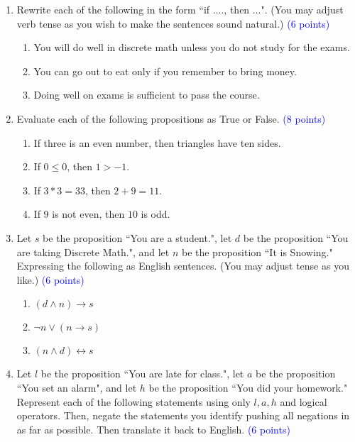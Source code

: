 \documentclass{article}
\newcommand{\pt}[1]{\textcolor{blue}{(#1 points)}}
\begin{document}
\begin{enumerate}

    \item Rewrite each of the following in the form ``if ...., then ...".  (You may adjust verb tense as you wish to make the sentences sound natural.) \pt 6
    
    \begin{enumerate}
        \item You will do well in discrete math unless you do not study for the exams.
        
        \item You can go out to eat only if you remember to bring money.
        
        \item Doing well on exams is sufficient to pass the course.
    \end{enumerate}
    
    
    \item Evaluate each of the following propositions as True or False. \pt 8
    \begin{enumerate}
        \item If three is an even number, then triangles have ten sides.
        \item If $0 \leq 0$, then $1 > -1$.
        \item If $3*3 = 33$, then $2+9=11$.
        \item If $9$ is not even, then $10$ is odd. 
    \end{enumerate}
    
    \item Let $s$ be the proposition ``You are a student.", let $d$ be the proposition ``You are taking Discrete Math.", and let $n$ be the proposition ``It is Snowing." Expressing the following as English sentences. (You may adjust tense as you like.) \pt 6
    
    \begin{enumerate}
        \item $(d \land n) \rightarrow s$
        \item $\lnot n \vee (n \rightarrow s)$
        \item $(n \land d) \leftrightarrow s$
    \end{enumerate}
    
    
    \item Let $l$ be the proposition ``You are late for class.", let $a$ be the proposition ``You set an alarm", and let $h$ be the proposition ``You did your homework." Represent each of the following statements using only $l, a, h$ and logical operators. Then, negate the statements you identify pushing all negations in as far as possible.  Then translate it back to English.  \pt 6
    

\end{enumerate}
\end{document}
